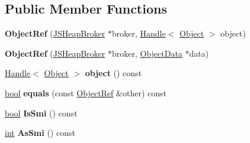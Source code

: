 \subsection*{Public Member Functions}
\begin{DoxyCompactItemize}
\item 
\mbox{\label{classv8_1_1internal_1_1compiler_1_1ObjectRef_a2fe7bf22ff92737ca562089d7ed4a503}} 
{\bfseries Object\+Ref} (\mbox{\hyperlink{classv8_1_1internal_1_1compiler_1_1JSHeapBroker}{J\+S\+Heap\+Broker}} $\ast$broker, \mbox{\hyperlink{classv8_1_1internal_1_1Handle}{Handle}}$<$ \mbox{\hyperlink{classv8_1_1internal_1_1Object}{Object}} $>$ object)
\item 
\mbox{\label{classv8_1_1internal_1_1compiler_1_1ObjectRef_ac99918403fb4debbbe7b18b2b8a3195c}} 
{\bfseries Object\+Ref} (\mbox{\hyperlink{classv8_1_1internal_1_1compiler_1_1JSHeapBroker}{J\+S\+Heap\+Broker}} $\ast$broker, \mbox{\hyperlink{classv8_1_1internal_1_1compiler_1_1ObjectData}{Object\+Data}} $\ast$data)
\item 
\mbox{\label{classv8_1_1internal_1_1compiler_1_1ObjectRef_a71a58ab8058faa3a2cab1a319d034ca7}} 
\mbox{\hyperlink{classv8_1_1internal_1_1Handle}{Handle}}$<$ \mbox{\hyperlink{classv8_1_1internal_1_1Object}{Object}} $>$ {\bfseries object} () const
\item 
\mbox{\label{classv8_1_1internal_1_1compiler_1_1ObjectRef_a90df28f45036d57244bace727eecd42b}} 
\mbox{\hyperlink{classbool}{bool}} {\bfseries equals} (const \mbox{\hyperlink{classv8_1_1internal_1_1compiler_1_1ObjectRef}{Object\+Ref}} \&other) const
\item 
\mbox{\label{classv8_1_1internal_1_1compiler_1_1ObjectRef_a021081835f32caf8f2f4a8339cd9f9f7}} 
\mbox{\hyperlink{classbool}{bool}} {\bfseries Is\+Smi} () const
\item 
\mbox{\label{classv8_1_1internal_1_1compiler_1_1ObjectRef_a630101fa75ccdb33676e7ad491eccb0f}} 
\mbox{\hyperlink{classint}{int}} {\bfseries As\+Smi} () const
\item 

\end{DoxyCompactItemize}

